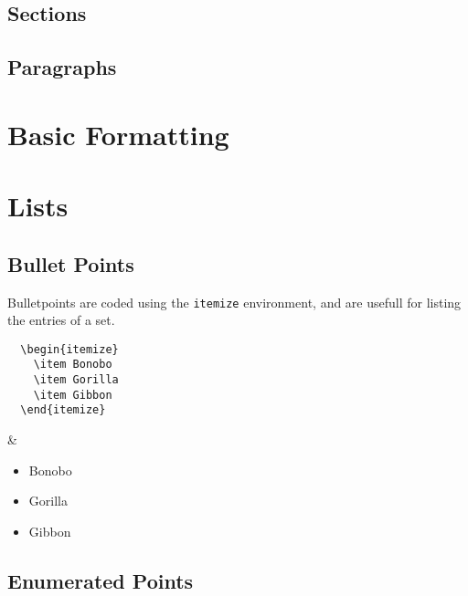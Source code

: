 \subsection{Sections}



\subsection{Paragraphs}

\section{Basic Formatting}

\section{Lists}
\subsection{Bullet Points}

Bulletpoints are coded using the \texttt{itemize} environment, and are usefull for listing the entries of a set.

\begin{latexdemo}
  \begin{verbatim}
  \begin{itemize}
    \item Bonobo
    \item Gorilla
    \item Gibbon
  \end{itemize}
  \end{verbatim}
  &
  \begin{itemize}
    \item Bonobo
    \item Gorilla
    \item Gibbon
  \end{itemize}
\end{latexdemo}

\subsection{Enumerated Points}

